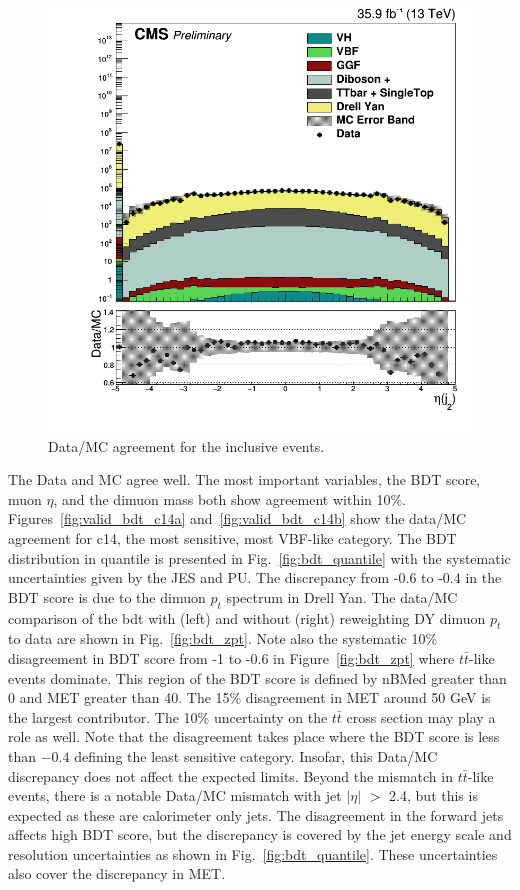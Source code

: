 \begin{figure}[h!]
  \includegraphics[width=0.32\linewidth]{images/bdt_cats/jet2_eta_cAll.png}
  \caption[Validation plots of the BDT input variables and the dimuon mass.]
   {Data/MC agreement for the inclusive events.}
  \label{fig:valid_bdt_incl-b}
\end{figure}

The Data and MC agree well. The most important variables, the BDT score, muon $\eta$, and the dimuon mass both show agreement within 10\%.
Figures~\ref{fig:valid_bdt_c14a} and~\ref{fig:valid_bdt_c14b} show the data/MC agreement for c14,
the most sensitive, most VBF-like category.
The BDT distribution in quantile is presented in Fig.~\ref{fig:bdt_quantile}
with the systematic uncertainties given by the JES and PU.
The discrepancy from -0.6 to -0.4 in the BDT score is due to the dimuon $p_t$ spectrum in Drell Yan.
The data/MC comparison of the bdt with (left) and without (right) reweighting DY dimuon $p_t$ to data
are shown in Fig.~\ref{fig:bdt_zpt}.
Note also the systematic 10\% disagreement in BDT score from -1 to -0.6 in Figure~\ref{fig:bdt_zpt} where $t\bar{t}$-like events dominate.
This region of the BDT score is defined by nBMed greater than 0 and MET greater than 40.
The 15\% disagreement in MET around 50 GeV is the largest contributor. The 10\% uncertainty
on the $t\bar{t}$ cross section may play a role as well.  Note that the disagreement takes place where the BDT score is less than $-0.4$
defining the least sensitive category. Insofar, this Data/MC discrepancy does not affect the expected limits.
Beyond the mismatch in $t\bar{t}$-like events, there is a notable Data/MC mismatch with jet $|\eta|$ $>$ 2.4, but this is expected as these are calorimeter only jets.
The disagreement in the forward jets affects high BDT score, but the discrepancy is covered by the jet energy scale and resolution uncertainties as shown in Fig.~\ref{fig:bdt_quantile}.
These uncertainties also cover the discrepancy in MET.

